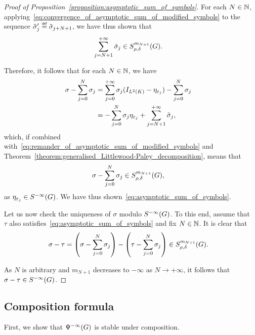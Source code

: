 \begin{proof}[Proof of Proposition~\ref{proposition:asymptotic_sum_of_symbols}]
    For each $N \in \mathbb{N}$,
    applying~\eqref{eq:convergence_of_asymptotic_sum_of_modified_symbols} to the sequence $\tilde \sigma'_j \defeq \tilde \sigma_{j + N + 1}$,
    we have thus shown that
    \begin{align}
        \sum_{j = N + 1}^{+\infty} \tilde \sigma_j
        \in S^{m_{N + 1}}_{\rho, \delta}(G).
        \label{eq:remander_of_asymptotic_sum_of_modified_symbols}
    \end{align}

    Therefore,
    it follows that for each $N \in \mathbb{N}$,
    we have
    \begin{align*}
        \sigma - \sum_{j = 0}^N \sigma_j
        &= \sum_{j = 0}^{+\infty} \sigma_j ({I_{{L^{2} (K)}}} - \eta_{\varepsilon_j}) - \sum_{j = 0}^N \sigma_j\\
        &= -\sum_{j = 0}^N \sigma_j \eta_{\varepsilon_j} + \sum_{j = N + 1}^{+\infty} \tilde \sigma_j,
    \end{align*}
    which, if combined with~\eqref{eq:remander_of_asymptotic_sum_of_modified_symbols}
    and Theorem~\ref{theorem:generalised_Littlewood-Paley_decomposition},
    means that
    \begin{align*}
        \sigma - \sum_{j = 0}^N \sigma_j
        \in S^{m_{N + 1}}_{\rho, \delta}(G),
    \end{align*}
    as $\eta_{\varepsilon_j} \in {S^{-\infty} (G)}$.
    We have thus shown~\eqref{eq:asymptotic_sum_of_symbols}.

    Let us now check the uniqueness of $\sigma$ modulo ${S^{-\infty} (G)}$.
    To this end,
    assume that $\tau$ also satisfies~\eqref{eq:asymptotic_sum_of_symbols}
    and fix $N \in \mathbb{N}$.
    It is clear that
    \begin{align*}
        \sigma - \tau
        = \left(\sigma - \sum_{j = 0}^N \sigma_j\right) -
        \left(\tau - \sum_{j = 0}^N \sigma_j\right)
        \in S^{m_{N + 1}}_{\rho, \delta}(G).
    \end{align*}

    As $N$ is arbitrary
    and $m_{N + 1}$ decreases to $-\infty$ as $N \to +\infty$,
    it follows that $\sigma - \tau \in {S^{-\infty} (G)}$.
\end{proof}

\subsection{Composition formula}

First, we show that ${\Psi^{-\infty} (G)}$ is stable under composition.

